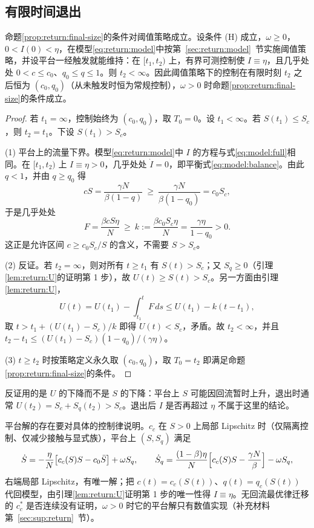\subsection{有限时间退出}
\label{sec:proof:return:exit}
命题\ref{prop:return:final-size}的条件对阈值策略成立。设条件 (H) 成立，$\omega\ge0$，$0<I(0)<\eta$，在模型\eqref{eq:return:model}中按第~\ref{sec:return:model}~节实施阈值策略，并设平台一经触发就能维持：在 $[t_1,t_2)$ 上，有界可测控制使 $I\equiv\eta$，且几乎处处 $0<c\le c_0$、$q_0\le q\le1$。则 $t_2<\infty$。因此阈值策略下的控制在有限时刻 $t_2$ 之后恒为 $(c_0,q_0)$（从未触发时恒为常规控制），$\omega>0$ 时命题\ref{prop:return:final-size}的条件成立。
\begin{proof}
若 $t_1=\infty$，控制始终为 $(c_0,q_0)$，取 $T_0=0$。设 $t_1<\infty$。若 $S(t_1)\le S_c$，则 $t_2=t_1$。下设 $S(t_1)>S_c$。

(1) 平台上的流量下界。模型\eqref{eq:return:model}中 $I$ 的方程与式\eqref{eq:model:full}相同。在 $[t_1,t_2)$ 上 $I\equiv\eta>0$，几乎处处 $\dot I=0$，即平衡式\eqref{eq:model:balance}。由此 $q<1$，并由 $q\ge q_0$ 得
\[
cS=\frac{\gamma N}{\beta(1-q)}\ \ge\ \frac{\gamma N}{\beta(1-q_0)}=c_0S_c ,
\]
于是几乎处处
\[
F=\frac{\beta cS\eta}{N}\ \ge\ k:=\frac{\beta c_0S_c\eta}{N}=\frac{\gamma\eta}{1-q_0}>0 .
\]
这正是允许区间 $c\ge c_0S_c/S$ 的含义，不需要 $S>S_c$。

(2) 反证。若 $t_2=\infty$，则对所有 $t\ge t_1$ 有 $S(t)>S_c$；又 $S_q\ge0$（引理\ref{lem:return:U}的证明第 1 步），故 $U(t)\ge S(t)>S_c$。另一方面由引理\ref{lem:return:U}，
\[
U(t)=U(t_1)-\int_{t_1}^tF\,ds\le U(t_1)-k(t-t_1),
\]
取 $t>t_1+(U(t_1)-S_c)/k$ 即得 $U(t)<S_c$，矛盾。故 $t_2<\infty$，并且 $t_2-t_1\le(U(t_1)-S_c)(1-q_0)/(\gamma\eta)$。

(3) $t\ge t_2$ 时按策略定义永久取 $(c_0,q_0)$，取 $T_0=t_2$ 即满足命题\ref{prop:return:final-size}的条件。
\end{proof}
反证用的是 $U$ 的下降而不是 $S$ 的下降：平台上 $S$ 可能因回流暂时上升，退出时通常 $U(t_2)=S_c+S_q(t_2)>S_c$。退出后 $I$ 是否再超过 $\eta$ 不属于这里的结论。

平台解的存在要对具体的控制律说明。$c_c$ 在 $S>0$ 上局部 Lipschitz 时（仅隔离控制、仅减少接触与显式族），平台上 $(S,S_q)$ 满足
\[
\dot S=-\frac{\eta}{N}\bigl[c_c(S)S-c_0\bar S\bigr]+\omega S_q,\qquad
\dot S_q=\frac{(1-\beta)\eta}{N}\Bigl[c_c(S)S-\frac{\gamma N}{\beta}\Bigr]-\omega S_q ,
\]
右端局部 Lipschitz，有唯一解；把 $c(t)=c_c(S(t))$、$q(t)=q_c(S(t))$ 代回模型，由引理\ref{lem:return:U}证明第 1 步的唯一性得 $I\equiv\eta$。无回流最优律迁移的 $c_c^*$ 是否连续没有证明，$\omega>0$ 时它的平台解只有数值实现（补充材料第~\ref{sec:sup:return}~节）。

